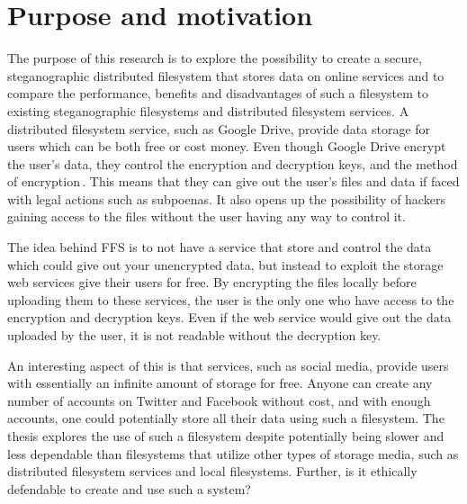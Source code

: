 
\section{Purpose and motivation}

The purpose of this research is to explore the possibility to create a secure, steganographic distributed filesystem that stores data on online services and to compare the performance, benefits and disadvantages of such a filesystem to existing steganographic filesystems and distributed filesystem services. A distributed filesystem service, such as Google Drive, provide data storage for users which can be both free or cost money. Even though Google Drive encrypt the user's data, they control the encryption and decryption keys, and the method of encryption\,\cite{johnsonGoogleDriveSecure2021}. This means that they can give out the user's files and data if faced with legal actions such as subpoenas. It also opens up the possibility of hackers gaining access to the files without the user having any way to control it.

The idea behind FFS is to not have a service that store and control the data which could give out your unencrypted data, but instead to exploit the storage web services give their users for free. By encrypting the files locally before uploading them to these services, the user is the only one who have access to the encryption and decryption keys. Even if the web service would give out the data uploaded by the user, it is not readable without the decryption key.

An interesting aspect of this is that services, such as social media, provide users with essentially an infinite amount of storage for free. Anyone can create any number of accounts on Twitter and Facebook without cost, and with enough accounts, one could potentially store all their data using such a filesystem. The thesis explores the use of such a filesystem despite potentially being slower and less dependable than filesystems that utilize other types of storage media, such as distributed filesystem services and local filesystems. Further, is it ethically defendable to create and use such a system?
